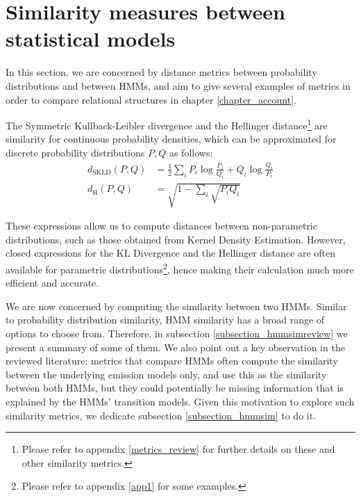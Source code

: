 \documentclass[../main.tex]{subfiles}
\begin{document}
\section{Similarity measures between statistical models} \label{section_similarity}
In this section, we are concerned by distance metrics between probability distributions and between HMMs, and aim to give several examples of metrics in order to compare relational structures in chapter \ref{chapter_account}. 
\par The Symmetric Kullback-Leibler divergence and the Hellinger distance\footnote{Please refer to appendix \ref{metrics_review} for further details on these and other similarity metrics.} are similarity for continuous probability densities, which can be approximated for discrete probability distributions $P, Q$ as follows:
\begin{align*}
d_{\text{SKLD}}(P, Q) &= \frac{1}{2}\sum_iP_i\log{\frac{P_i}{Q_i}} + Q_i\log{\frac{Q_i}{P_i}}\\
d_{\text{H}}(P, Q) &= \sqrt{1 - \sum_i \sqrt{P_iQ_i}}
\end{align*}
\par These expressions allow us to compute distances between non-parametric distributions, such as those obtained from Kernel Density Estimation. However, closed expressions for the KL Divergence and the Hellinger distance are often available for parametric distributions\footnote{Please refer to appendix \ref{app1} for some examples.}, hence making their calculation much more efficient and accurate.
\par We are now concerned by computing the similarity between two HMMs. Similar to probability distribution similarity, HMM similarity has a broad range of options to choose from. Therefore, in subsection \ref{subsection_hmmsimreview} we present a summary of some of them. We also point out a key observation in the reviewed literature: metrics that compare HMMs often compute the similarity between the underlying emission models only, and use this as the similarity between both HMMs, but they could potentially be missing information that is explained by the HMMs' transition models. Given this motivation to explore such similarity metrics, we dedicate subsection \ref{subsection_hmmsim} to do it.
\end{document}
